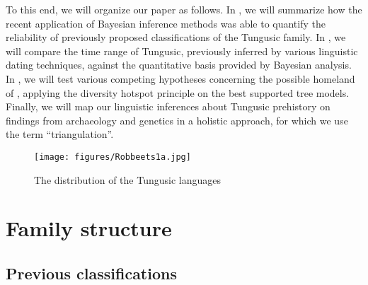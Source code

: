\documentclass[output=paper,colorlinks,citecolor=brown]{langscibook}
\begin{document}
To this end, we will organize our paper as follows. In , we will summarize how the recent application of Bayesian inference methods was able to quantify the reliability of previously proposed classifications of the Tungusic family. In , we will compare  the time range of Tungusic, previously inferred by various linguistic dating techniques, against the quantitative basis provided by Bayesian analysis. In , we will test various competing hypotheses concerning the possible homeland of , applying the diversity hotspot principle on the best supported tree models. Finally, we will map our linguistic inferences about Tungusic prehistory on findings from archaeology and genetics in a holistic approach, for which we use the term “triangulation”.

\begin{figure}
\texttt{[image: figures/Robbeets1a.jpg]}
\caption{The distribution of the Tungusic languages}
\label{fig:8:1}
\end{figure}


\section{Family structure}\label{Section8.2}

\subsection{Previous classifications}\label{Section8.2.1}
\end{document}
